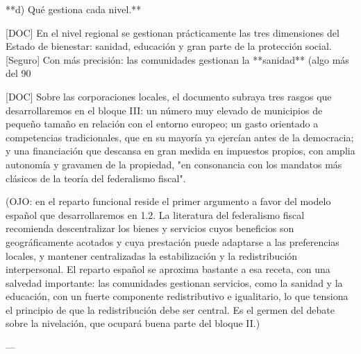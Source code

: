 \documentclass[10pt,a4paper]{article}
\begin{document}
**d) Qué gestiona cada nivel.**

[DOC] En el nivel regional se gestionan prácticamente las tres dimensiones del Estado de bienestar: sanidad, educación y gran parte de la protección social. [Seguro] Con más precisión: las comunidades gestionan la **sanidad** (algo más del 90%

[DOC] Sobre las corporaciones locales, el documento subraya tres rasgos que desarrollaremos en el bloque III: un número muy elevado de municipios de pequeño tamaño en relación con el entorno europeo; un gasto orientado a competencias tradicionales, que en su mayoría ya ejercían antes de la democracia; y una financiación que descansa en gran medida en impuestos propios, con amplia autonomía y gravamen de la propiedad, "en consonancia con los mandatos más clásicos de la teoría del federalismo fiscal".

(OJO: en el reparto funcional reside el primer argumento a favor del modelo español que desarrollaremos en 1.2. La literatura del federalismo fiscal recomienda descentralizar los bienes y servicios cuyos beneficios son geográficamente acotados y cuya prestación puede adaptarse a las preferencias locales, y mantener centralizadas la estabilización y la redistribución interpersonal. El reparto español se aproxima bastante a esa receta, con una salvedad importante: las comunidades gestionan servicios, como la sanidad y la educación, con un fuerte componente redistributivo e igualitario, lo que tensiona el principio de que la redistribución debe ser central. Es el germen del debate sobre la nivelación, que ocupará buena parte del bloque II.)

---
\end{document}
